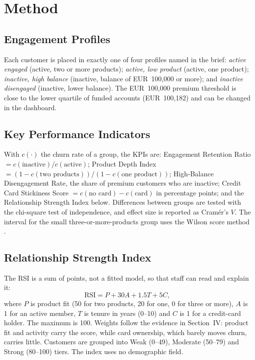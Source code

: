 \documentclass[10pt,twocolumn,letterpaper]{article}
\begin{document}
\section{Method}
\subsection{Engagement Profiles}
Each customer is placed in exactly one of four profiles named in the brief: \textit{active engaged} (active, two or more products); \textit{active, low product} (active, one product); \textit{inactive, high balance} (inactive, balance of EUR~100,000 or more); and \textit{inactive disengaged} (inactive, lower balance). The EUR~100,000 premium threshold is close to the lower quartile of funded accounts (EUR~100,182) and can be changed in the dashboard.

\subsection{Key Performance Indicators}
With $c(\cdot)$ the churn rate of a group, the KPIs are: Engagement Retention Ratio $= c(\text{inactive})/c(\text{active})$; Product Depth Index $= (1-c(\text{two products}))/(1-c(\text{one product}))$; High-Balance Disengagement Rate, the share of premium customers who are inactive; Credit Card Stickiness Score $= c(\text{no card}) - c(\text{card})$ in percentage points; and the Relationship Strength Index below. Differences between groups are tested with the chi-square test of independence, and effect size is reported as Cram\'er's $V$. The interval for the small three-or-more-products group uses the Wilson score method \cite{wilson}.

\subsection{Relationship Strength Index}
The RSI is a sum of points, not a fitted model, so that staff can read and explain it:
\begin{equation}
\mathrm{RSI} = P + 30A + 1.5T + 5C,
\end{equation}
where $P$ is product fit (50 for two products, 20 for one, 0 for three or more), $A$ is 1 for an active member, $T$ is tenure in years (0--10) and $C$ is 1 for a credit-card holder. The maximum is 100. Weights follow the evidence in Section~IV: product fit and activity carry the score, while card ownership, which barely moves churn, carries little. Customers are grouped into Weak (0--49), Moderate (50--79) and Strong (80--100) tiers. The index uses no demographic field.
\end{document}
